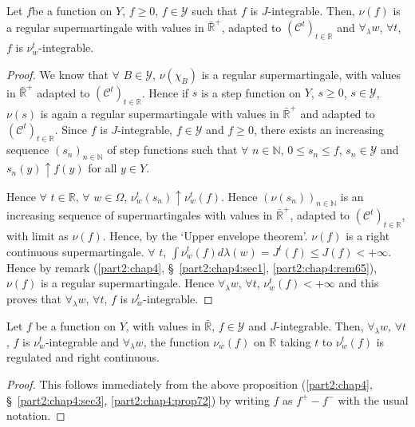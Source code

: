 \begin{proposition}\label{part2:chap4:prop72}
Let $f$\pageoriginale be a function on $Y$, $f \geq 0$, $f \in \mathscr{Y}$ such
that $f$ is $J$-integrable. Then, $\nu(f)$ is a regular supermartingale
with values in $\bar{\mathbb{R}}^+$, adapted to $(\mathscr{C}^t)_{t\in
\mathbb{R}}$ and $\forall_\lambda w$, $\forall t$, $f$ is
$\nu^t_w$-integrable. 
\end{proposition}

\begin{proof}
We know that $\forall$ $B \in \mathscr{Y}$, $\nu(\chi_B)$ is a regular
supermartingale, with values in $\bar{\mathbb{R}}^+$ adapted to
$(\mathscr{C}^t)_{t \in \mathbb{R}}$. Hence if $s$ is a step function
on $Y$, $s \geq 0$, $s \in \mathscr{Y}$, $\nu(s)$ is again a regular
supermartingale with values in $\bar{\mathbb{R}}^+$ and adapted to
$(\mathscr{C}^t)_{t \in \mathbb{R}}$. Since $f$ is $J$-integrable, $f
\in \mathscr{Y}$ and $f \geq 0$, there exists an increasing sequence
$(s_n)_{n \in \mathbb{N}}$ of step functions such that $\forall$ $n
\in \mathbb{N}$, $0\leq s_n \leq f$, $s_n \in \mathscr{Y}$ and $s_n(y)
\uparrow f(y)$ for all $y \in Y$. 

Hence $\forall$ $t \in \mathbb{R}$, $\forall $ $w \in \Omega$,
$\nu^t_w (s_n) \uparrow \nu^t_w(f)$. Hence $(\nu(s_n))_{n \in
  \mathbb{N}}$ is an increasing sequence of supermartingales with
values in $\bar{\mathbb{R}}^+$, adapted to $(\mathscr{C}^t)_{t \in
  \mathbb{R}}$, with limit as $\nu(f)$. Hence, by the `Upper envelope
theorem'. $\nu(f)$ is a right continuous supermartingale. $\forall$
$t$, $\int \nu^t_w(f) d\lambda(w)  = J^t (f) \leq J(f) <+
\infty$. Hence by remark (\ref{part2:chap4},
\S\ \ref{part2:chap4:sec1}, \ref{part2:chap4:rem65}), $\nu(f)$ is a regular 
supermartingale. Hence $\forall_\lambda w$, $\forall t$, $\nu^t_w(f) <
+ \infty$ and this proves that $\forall_\lambda w$, $\forall t$, $f$
is $\nu^t_w$-integrable. 
\end{proof}

\begin{corollary}\label{part2:chap4:coro73}
Let $f$ be a function on $Y$, with values in $\bar{\mathbb{R}}$, $f
\in \mathscr{Y}$ and $J$-integrable. Then, $\forall_\lambda w$,
$\forall t$, $f$ is $\nu^t_w$-integrable and $\forall_\lambda w$, the
function $\nu_w(f)$ on $\mathbb{R}$ taking $t$ to $\nu^t_w(f)$ is
regulated and right continuous. 
\end{corollary}

\begin{proof}
This follows immediately from the above proposition
(\ref{part2:chap4}, \S\ \ref{part2:chap4:sec3},
\ref{part2:chap4:prop72}) by 
writing $f$ as $f^+ - f^-$ with the usual notation. 
\end{proof}


